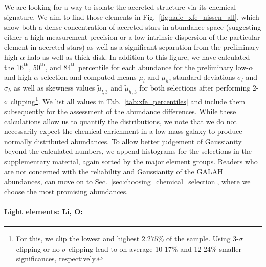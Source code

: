 \documentclass[fleqn,usenatbib]{mnras}
\begin{document}
We are looking for a way to isolate the accreted structure via its chemical signature. We aim to find those elements in Fig.~\ref{fig:nafe_xfe_nissen_all}, which show both a dense concentration of accreted stars in abundance space (suggesting either a high measurement precision or a low intrinsic dispersion of the particular element in accreted stars) as well as a significant separation from the preliminary high-$\alpha$ halo as well as thick disk. In addition to this figure, we have calculated the $16^\text{th}$, $50^\text{th}$, and $84^\text{th}$ percentile for each abundance for the preliminary low-$\alpha$ and high-$\alpha$ selection and computed means $\mu_l$ and $\mu_h$, standard deviations $\sigma_l$ and $\sigma_h$ as well as skewness values $\tilde{\mu}_{l,3}$ and $\tilde{\mu}_{h,3}$ for both selections after performing 2-$\sigma$ clipping\footnote{For this, we clip the lowest and highest $2.275\%$ of the sample. Using 3-$\sigma$ clipping or no $\sigma$ clipping lead to on average 10-17\% and 12-24\% smaller significances, respectively.}. We list all values in Tab.~\ref{tab:xfe_percentiles} and include them subsequently for the assessment of the abundance differences. While these calculations allow us to quantify the distributions, we note that we do not necessarily expect the chemical enrichment in a low-mass galaxy to produce normally distributed abundances. To allow better judgement of Gaussianity beyond the calculated numbers, we append histograms for the selections in the supplementary material, again sorted by the major element groups. Readers who are not concerned with the reliability and Gaussianity of the GALAH abundances, can move on to Sec.~\ref{sec:choosing_chemical_selection}, where we choose the most promising abundances.


\paragraph*{Light elements: Li, O:}
\end{document}
